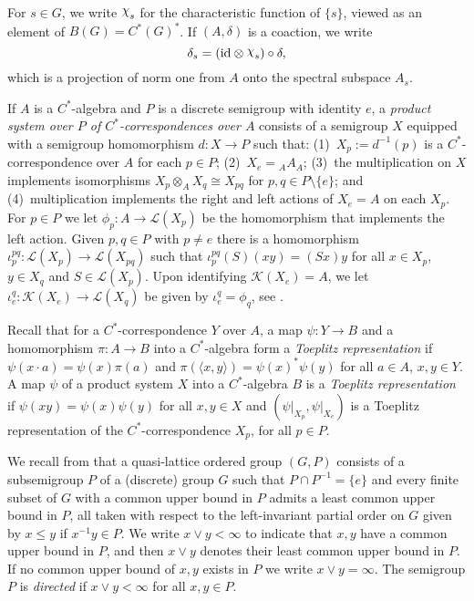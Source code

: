 \documentclass[12pt]{amsart}
\theoremstyle{plain}
\theoremstyle{remark}
\theoremstyle{definition}
\numberwithin{equation}{section}
\theoremstyle{plain}
\theoremstyle{definition}
\theoremstyle{remark}
\begin{document}
For $s\in G$, we write ${\raisebox{2pt}{\ensuremath{\chi}}}_s$ for the characteristic function of $\{s\}$, viewed as an element of $B(G)=C^*(G)^*$.
If $(A,\delta)$ is a coaction, we write
\begin{equation}\label{def:delta_s}
\delta_s=({\operatorname{id}}\otimes{\raisebox{2pt}{\ensuremath{\chi}}}_s)\circ\delta,
\end{equation}
which is a projection of norm one from $A$ onto the spectral subspace $A_s$.

\vskip 0.2cm
If $A$ is a $C^*$-algebra and $P$ is a discrete semigroup with identity $e$, a
\emph{product system over $P$ of $C^*$-correspondences over $A$} consists
of a semigroup $X$ equipped with a semigroup homomorphism $d
\colon X \to P$ such that: (1)~$X_p := d^{-1}(p)$ is a
$C^*$-correspondence over $A$ for each $p\in P$; (2)~$X_e =
{_A}A_A$; (3)~the multiplication on $X$ implements isomorphisms
$X_p \otimes_A X_q \cong X_{pq}$ for $p,q \in P \setminus
\{e\}$; and (4)~multiplication implements the right and left
actions of $X_e = A$ on each $X_p$.
For $p \in P$ we let $\phi_p:A\to{\mathcal L}(X_p)$ be the homomorphism that implements the left action.
Given $p, q \in P$ with $p \not= e$ there is a homomorphism
$\iota^{pq}_p \colon {\mathcal L}(X_p) \to {\mathcal L}(X_{pq})$ such that
$\iota^{pq}_p(S)(xy) = (Sx)y$ for all $x \in X_p$, $y \in
X_{q}$ and $S \in {\mathcal L}(X_p)$. Upon identifying ${\mathcal K}(X_e)=A$, we let
$\iota^q_e \colon {\mathcal K}(X_e)\to {\mathcal L}(X_{q})$ be given by $\iota^q_e=\phi_q$, see \cite[\S 2.2]{SY}.

Recall that for a $C^*$-correspondence $Y$ over $A$, a map $\psi:Y\to B$ and
a homomorphism $\pi:A\to B$ into a $C^*$-algebra form a \emph{Toeplitz representation} if
$\psi(x\cdot a)=\psi(x)\pi(a)$ and $\pi(\langle x, y\rangle)=\psi(x)^*\psi(y)$ for
all $a\in A$, $x,y\in Y$. A map $\psi$ of a product system $X$ into a $C^*$-algebra $B$ is a \emph{Toeplitz representation} if
$\psi(xy)=\psi(x)\psi(y)$ for all $x,y\in X$ and $(\psi\vert_{X_p},\psi\vert_{X_e})$ is a Toeplitz
representation of the $C^*$-correspondence $X_p$, for all $p\in P$.

\vskip0.2cm
We recall from \cite{N} that a quasi-lattice ordered group $(G, P)$ consists of a subsemigroup
$P$ of a (discrete) group $G$ such that $P\cap P^{-1}=\{e\}$ and every finite subset of $G$ with a
common upper bound in $P$ admits a least common upper bound in $P$, all taken with respect to the left-invariant partial order
on $G$ given by $x\leq y$ if $x^{-1}y\in P$. We write $x\vee y<\infty$ to indicate that $x,y$ have
a common upper bound in $P$, and then $x\vee y$ denotes their least common upper bound in $P$.
If no common upper bound of $x,y$ exists in $P$ we write $x\vee y=\infty$. The semigroup $P$
is \emph{directed} if $x\vee y<\infty$ for all $x,y\in P$.
\end{document}
